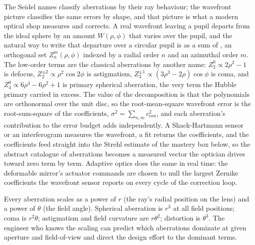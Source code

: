 The Seidel names classify aberrations by their ray behaviour; the wavefront
picture classifies the same errors by shape, and that picture is what a modern
optical shop measures and corrects. A real wavefront leaving a pupil departs
from the ideal sphere by an amount $W(\rho, \phi)$ that varies over the pupil,
and the natural way to write that departure over a circular pupil is as a sum of
, an orthogonal set $Z_n^m(\rho, \phi)$ indexed by a
radial order $n$ and an azimuthal order $m$. The low-order terms are the
classical aberrations by another name: $Z_2^0 \propto 2\rho^2 - 1$ is defocus,
$Z_2^{\pm 2} \propto \rho^2\cos 2\phi$ is astigmatism, $Z_3^{\pm 1} \propto
(3\rho^3 - 2\rho)\cos\phi$ is coma, and $Z_4^0 \propto 6\rho^4 - 6\rho^2 + 1$ is
primary spherical aberration, the very term the Hubble primary carried in
excess. The value of the decomposition is that the polynomials are orthonormal
over the unit disc, so the root-mean-square wavefront error is the
root-sum-square of the coefficients, $\sigma^2 = \sum_{n,m} c_{nm}^2$, and each
aberration's contribution to the error budget adds independently. A
Shack-Hartmann sensor or an interferogram measures the wavefront, a fit returns
the coefficients, and the coefficients feed straight into the Strehl estimate of
the mastery box below, so the abstract catalogue of aberrations becomes a
measured vector the optician drives toward zero term by term. Adaptive optics
does the same in real time: the deformable mirror's actuator commands are chosen
to null the largest Zernike coefficients the wavefront sensor reports on every
cycle of the correction loop.

\begin{archetype}
Every aberration scales as a power of $r$ (the ray's radial position
on the lens) and a power of $\theta$ (the field angle). Spherical
aberration is $r^{3}$ at all field positions; coma is $r^{2}\theta$;
astigmatism and field curvature are $r\theta^{2}$; distortion is
$\theta^{3}$. The engineer who knows the scaling can predict which
aberrations dominate at given aperture and field-of-view and direct
the design effort to the dominant terms.
\end{archetype}

